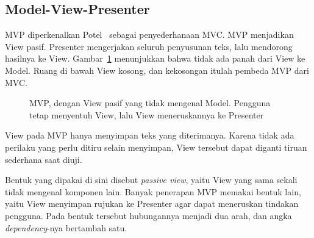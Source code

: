 \subsection{Model-View-Presenter}

MVP diperkenalkan Potel~\cite{potel1996mvp} sebagai penyederhanaan MVC. MVP
menjadikan View pasif. Presenter mengerjakan seluruh penyusunan teks, lalu
mendorong hasilnya ke View. Gambar~\ref{fig:mvp} menunjukkan bahwa tidak ada
panah dari View ke Model. Ruang di bawah View kosong, dan kekosongan itulah
pembeda MVP dari MVC.

\begin{figure}[htbp]
  \centering
  \caption{MVP, dengan View pasif yang tidak mengenal Model. Pengguna tetap
    menyentuh View, lalu View meneruskannya ke Presenter}
  \label{fig:mvp}
\end{figure}

View pada MVP hanya menyimpan teks yang diterimanya. Karena tidak ada perilaku
yang perlu ditiru selain menyimpan, View tersebut dapat diganti tiruan sederhana
saat diuji.

Bentuk yang dipakai di sini disebut \textit{passive view}, yaitu View yang sama
sekali tidak mengenal komponen lain. Banyak penerapan MVP memakai bentuk lain,
yaitu View menyimpan rujukan ke Presenter agar dapat meneruskan tindakan
pengguna. Pada bentuk tersebut hubungannya menjadi dua arah, dan angka
\textit{dependency}-nya bertambah satu.

